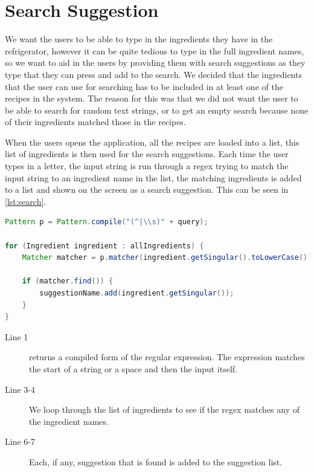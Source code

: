 \section{Search Suggestion}
We want the users to be able to type in the ingredients they have in the refrigerator, however it can be quite tedious to type in the full ingredient names, so we want to aid in the users by providing them with search suggestions as they type that they can press and add to the search. We decided that the ingredients that the user can use for searching has to be included in at least one of the recipes in the system. The reason for this was that we did not want the user to be able to search for random text strings, or to get an empty search because none of their ingredients matched those in the recipes. 

When the users opens the application, all the recipes are loaded into a list, this list of ingredients is then used for the search suggestions. Each time the user types in a letter, the input string is run through a regex trying to match the input string to an ingredient name in the list, the matching ingredients is added to a list and shown on the screen as a search suggestion. This can be seen in \autoref{lst:search}.

\begin{lstlisting}[language=java, label=lst:search, caption={Search suggestions}]
Pattern p = Pattern.compile("(^|\\s)" + query);

for (Ingredient ingredient : allIngredients) {
    Matcher matcher = p.matcher(ingredient.getSingular().toLowerCase());

    if (matcher.find()) {
        suggestionName.add(ingredient.getSingular());
    }
}
\end{lstlisting}

\begin{description}
\item[Line 1]  returns a compiled form of the regular expression. The expression matches the start of a string or a space and then the input itself. 
\item[Line 3-4] We loop through the list of ingredients to see if the regex matches any of the ingredient names.
\item[Line 6-7] Each, if any, suggestion that is found is added to the suggestion list.
\end{description}

